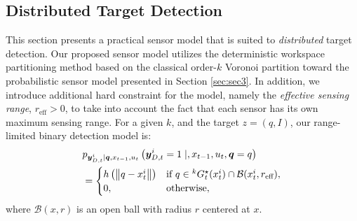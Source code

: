 \documentclass[letterpaper, 10 pt, conference]{ieeeconf}
\begin{document}
\subsection{Distributed Target Detection}
This section presents a practical sensor model that is suited to \emph{distributed} target detection.
Our proposed sensor model utilizes the deterministic workspace partitioning method based on the classical order-$k$ Voronoi partition toward the probabilistic sensor model presented in Section \ref{sec:sec3}. 
In addition, we introduce additional hard constraint for the model, namely the \emph{effective sensing range}, $r_{\text{eff}} >0$, to take into account the fact that each sensor has its own maximum sensing range. 
For a given $k$, and the target $z = (q,I)$, our range-limited binary detection model is:
\begin{align}
&p_{\bm{y}_{D,t}^i \mid \bm{q},x_{t-1},u_t
}\left(\bm{y}_{D,t}^i = 1 \mid ,x_{t-1},u_t,\bm{q}=q
\right) \nonumber\\
&=\begin{cases}
h\left(\left\|q-x_t^i \right\|\right) & \textup{if }q \in {}^kG_t^{\star}(x_t^i)
\cap \mathcal{B}(x_t^i,r_{\text{eff}})
,\nonumber \\
0, & \textup{otherwise},
\end{cases}\nonumber 
\end{align}
where $\mathcal{B}(x,r)$ is an open ball with radius $r$ centered at $x$.
\end{document}
